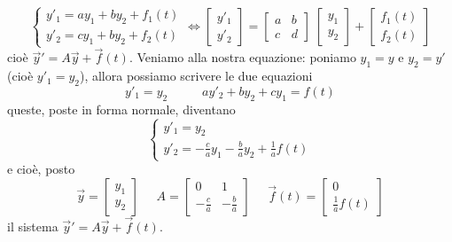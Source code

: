 \[
    \begin{cases}
        y'_1 = ay_1 + by_2 + f_1(t)\\
        y'_2 = cy_1 + by_2 + f_2(t)
    \end{cases} \Leftrightarrow \left[\begin{matrix}
        y'_1\\y'_2        
    \end{matrix}\right] = \left[\begin{matrix}
        a & b \\ c & d
    \end{matrix}\right] \; \left[\begin{matrix}
        y_1\\y_2        
    \end{matrix}\right] + \left[\begin{matrix}
        f_1(t)\\f_2(t)
    \end{matrix}\right]
\]
cioè $\vec{y}' = A \vec{y} + \vec{f}(t)$.\newline
\newline
Veniamo alla nostra equazione: poniamo $y_1 = y$ e $y_2 = y'$ (cioè $y'_1 = y_2$), allora possiamo scrivere le due equazioni
\[
    y'_1 = y_2 \;\;\;\;\;\;\;\;\;\;ay'_2 + by_2 + cy_1 = f(t)
\]
queste, poste in forma normale, diventano
\[
    \begin{cases}
        y'_1 = y_2\\
        y'_2 = - \frac{c}{a}y_1 - \frac{b}{a}y_2 + \frac{1}{a} f(t)
    \end{cases}
\]
e cioè, posto
\[
    \vec{y} = \left[\begin{matrix}
        y_1\\y_2
    \end{matrix}\right] \;\;\;\;\; A = \left[\begin{matrix}
        0 & 1  \\ -\frac{c}{a} & - \frac{b}{a}
    \end{matrix}\right] \;\;\;\;\; \vec{f}(t) = \left[\begin{matrix}
        0 \\ \frac{1}{a}f(t)
    \end{matrix}\right]
\]
il sistema $\vec{y}' = A \vec{y} + \vec{f}(t)$.
